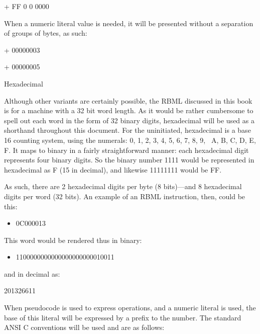 \documentclass[]{article}
\providecommand{\tightlist}{%
  \setlength{\itemsep}{0pt}\setlength{\parskip}{0pt}}
\begin{document}
+ FF 0 0 0000

When a numeric literal value is needed, it will be presented without a
separation of groups of bytes, as such:

+ 00000003

+ 00000005

Hexadecimal

Although other variants are certainly possible, the RBML discussed in
this book is for a machine with a 32 bit word length. As it would be
rather cumbersome to spell out each word in the form of 32 binary
digits, hexadecimal will be used as a shorthand throughout this
document. For the uninitiated, hexadecimal is a base 16 counting system,
using the numerals: 0, 1, 2, 3, 4, 5, 6, 7, 8, 9,~ A, B, C, D, E, F. It
maps to binary in a fairly straightforward manner: each hexadecimal
digit represents four binary digits. So the binary number 1111 would be
represented in hexadecimal as F (15 in decimal), and likewise 11111111
would be FF.

As such, there are 2 hexadecimal digits per byte (8 bits)---and 8
hexadecimal digits per word (32 bits). An example of an RBML
instruction, then, could be this:

\begin{itemize}
\tightlist
\item
  0C000013
\end{itemize}

This word would be rendered thus in binary:

\begin{itemize}
\tightlist
\item
  1100000000000000000000010011
\end{itemize}

and in decimal as:

201326611

When pseudocode is used to express operations, and a numeric literal is
used, the base of this literal will be expressed by a prefix to the
number. The standard ANSI C conventions will be used and are as follows:
\end{document}
